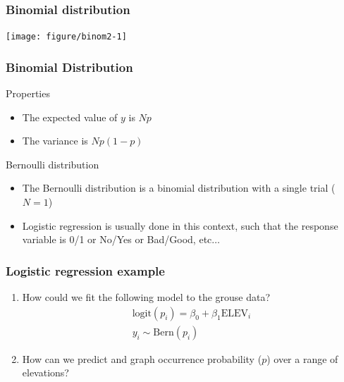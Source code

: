 \documentclass[color=usenames,dvipsnames]{beamer}\usepackage[]{graphicx}\usepackage[]{xcolor}
\newenvironment{knitrout}{}{} %
\begin{document}
\begin{frame}[fragile]
  \frametitle{Binomial distribution}%
  \vspace{-0.4cm}
\begin{center}
\begin{knitrout}
\color{fgcolor}
\texttt{[image: figure/binom2-1]} 
\end{knitrout}
\end{center}
\end{frame}




\begin{frame}
  \frametitle{Binomial Distribution}
  {Properties}
  \begin{itemize}
    \item The expected value of $y$ is $Np$
    \item The variance is $Np(1-p)$
  \end{itemize}
  \pause
  \vfill
  {Bernoulli distribution}
  \begin{itemize}
    \item The Bernoulli distribution is a binomial distribution with a
      single trial ($N=1$)
    \item Logistic regression is usually done in this context, such
      that the response variable is 0/1 or No/Yes or Bad/Good, etc$\dots$
  \end{itemize}
\end{frame}







\begin{frame}
  \frametitle{Logistic regression example}
  \begin{enumerate}
  \item How could we fit the following model to the grouse data?
    \begin{gather*}
      \mathrm{logit}(p_i) = \beta_0 + \beta_1\mathrm{ELEV}_i \\
      y_i \sim \mathrm{Bern}(p_i)
    \end{gather*}
  \item How can we predict and graph occurrence probability ($p$) over a range of
    elevations?
  \end{enumerate}
\end{frame}
\end{document}
